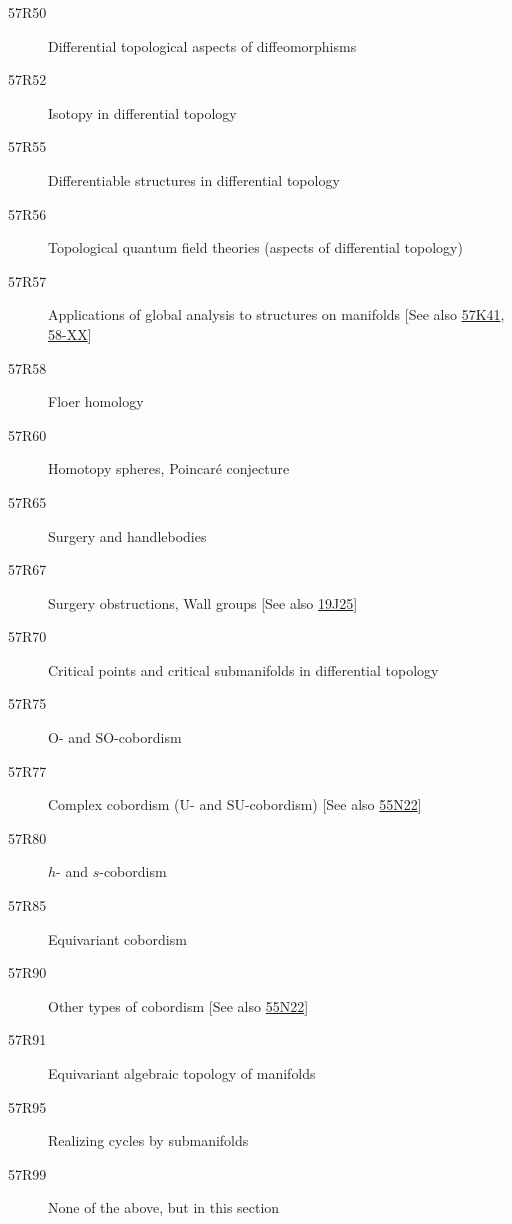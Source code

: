 \documentclass[letterpaper]{article}
\begin{document}
\begin{description}
\item [57R50]\label{57R50} Differential topological aspects of diffeomorphisms
\item [57R52]\label{57R52} Isotopy in differential topology
\item [57R55]\label{57R55} Differentiable structures in differential topology
\item [57R56]\label{57R56} Topological quantum field theories (aspects of differential topology)
\item [57R57]\label{57R57} Applications of global analysis to structures on manifolds [See also \hyperref[57K41]{57K41}, \hyperref[58-XX]{58-XX}]
\item [57R58]\label{57R58} Floer homology
\item [57R60]\label{57R60} Homotopy spheres, Poincar\'{e} conjecture
\item [57R65]\label{57R65} Surgery and handlebodies
\item [57R67]\label{57R67} Surgery obstructions, Wall groups [See also \hyperref[19J25]{19J25}]
\item [57R70]\label{57R70} Critical points and critical submanifolds in differential topology
\item [57R75]\label{57R75} $\mathrm{O}$- and $\mathrm{SO}$-cobordism
\item [57R77]\label{57R77} Complex cobordism ($\mathrm{U}$- and $\mathrm{SU}$-cobordism) [See also \hyperref[55N22]{55N22}]
\item [57R80]\label{57R80} $h$- and $s$-cobordism
\item [57R85]\label{57R85} Equivariant cobordism
\item [57R90]\label{57R90} Other types of cobordism [See also \hyperref[55N22]{55N22}]
\item [57R91]\label{57R91} Equivariant algebraic topology of manifolds
\item [57R95]\label{57R95} Realizing cycles by submanifolds
\item [57R99]\label{57R99} None of the above, but in this section
\end{description}
\end{document}
